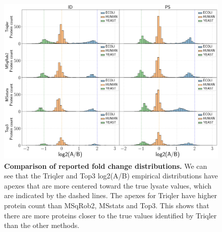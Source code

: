 \documentclass[11pt]{article}
\begin{document}
\begin{figure}[hbt]
    \centering
    \setlength{\tabcolsep}{0pt}

    \includegraphics[width=\linewidth]{../../result/report_plots/gridplot_histogram.png} 


    \caption{{\bf Comparison of reported fold change distributions.} We can see that the Triqler and Top3 log2(A/B) empirical distributions have apexes that are more centered toward the true lysate values, which are indicated by the dashed lines. The apexes for Triqler have higher protein count than MSqRob2, MSstats and Top3. This shows that there are more proteins closer to the true values identified by Triqler than the other methods. \label{fig:fc_histogram_supplement}}
\end{figure}
\end{document}
